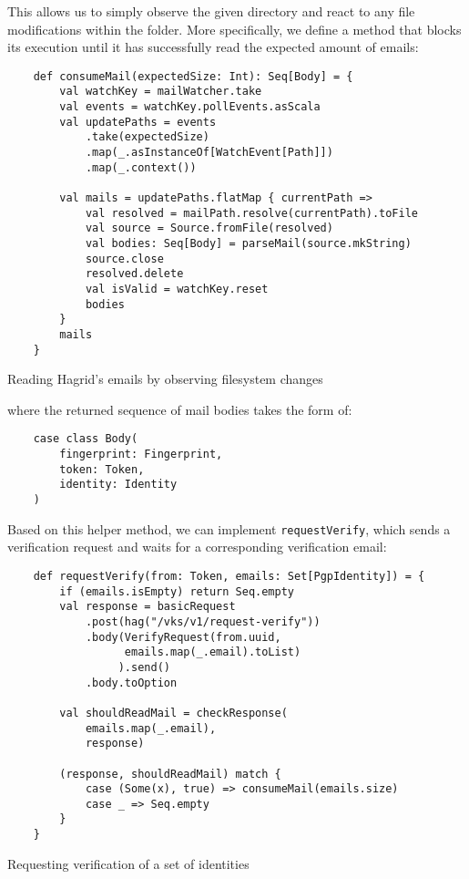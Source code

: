 This allows us to simply observe the given directory and react to any file modifications within the folder.
More specifically, we define a method that blocks its execution until it has successfully read the expected amount of emails: 
\begin{code}
    
    \begin{verbatim}
    def consumeMail(expectedSize: Int): Seq[Body] = {
        val watchKey = mailWatcher.take
        val events = watchKey.pollEvents.asScala
        val updatePaths = events
            .take(expectedSize)
            .map(_.asInstanceOf[WatchEvent[Path]])
            .map(_.context())
    
        val mails = updatePaths.flatMap { currentPath =>
            val resolved = mailPath.resolve(currentPath).toFile
            val source = Source.fromFile(resolved)
            val bodies: Seq[Body] = parseMail(source.mkString)
            source.close
            resolved.delete
            val isValid = watchKey.reset
            bodies
        }
        mails
    }
    \end{verbatim}
    \caption{Reading Hagrid's emails by observing filesystem changes}
    \label{code:consumeMail}
\end{code}

where the returned sequence of mail bodies takes the form of:
\begin{verbatim}
    case class Body(
        fingerprint: Fingerprint, 
        token: Token, 
        identity: Identity
    )
\end{verbatim}

Based on this helper method, we can implement \texttt{requestVerify}, which sends a verification request and waits for a corresponding verification email:
\begin{code}
    \begin{verbatim}
    def requestVerify(from: Token, emails: Set[PgpIdentity]) = {
        if (emails.isEmpty) return Seq.empty
        val response = basicRequest
            .post(hag("/vks/v1/request-verify"))
            .body(VerifyRequest(from.uuid, 
                  emails.map(_.email).toList)
                 ).send()
            .body.toOption

        val shouldReadMail = checkResponse(
            emails.map(_.email), 
            response)

        (response, shouldReadMail) match {
            case (Some(x), true) => consumeMail(emails.size)
            case _ => Seq.empty
        }
    }
    \end{verbatim}
    \caption{Requesting verification of a set of identities}
\end{code}

